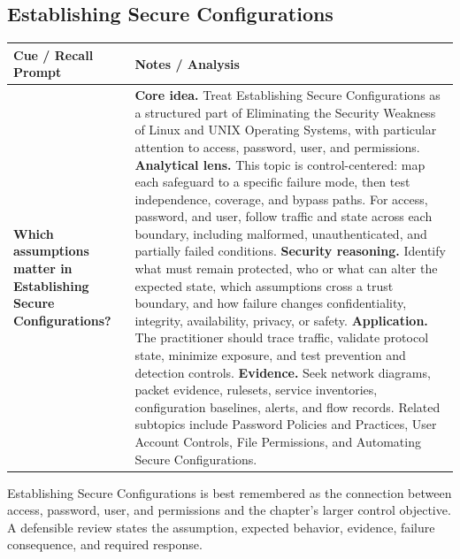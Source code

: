 \documentclass[11pt]{article}
\newcommand{\CornellHeader}{%
\rowcolor{Navy}\color{white}\bfseries Cue / Recall Prompt & \color{white}\bfseries Notes / Analysis\\\hline}
\newcommand{\CornellRow}[2]{%
\cellcolor{CueGray}\RaggedRight\textbf{#1} & \RaggedRight #2\\\hline}
\begin{document}
\subsection*{Establishing Secure Configurations}
\begin{longtable}{>{\RaggedRight\arraybackslash}p{}|>{\RaggedRight\arraybackslash}p{}}
\CornellHeader
\CornellRow{Which assumptions matter in Establishing Secure Configurations?}{\textbf{Core idea.} Treat Establishing Secure Configurations as a structured part of Eliminating the Security Weakness of Linux and UNIX Operating Systems, with particular attention to access, password, user, and permissions. \textbf{Analytical lens.} This topic is control-centered: map each safeguard to a specific failure mode, then test independence, coverage, and bypass paths. For access, password, and user, follow traffic and state across each boundary, including malformed, unauthenticated, and partially failed conditions. \textbf{Security reasoning.} Identify what must remain protected, who or what can alter the expected state, which assumptions cross a trust boundary, and how failure changes confidentiality, integrity, availability, privacy, or safety. \textbf{Application.} The practitioner should trace traffic, validate protocol state, minimize exposure, and test prevention and detection controls. \textbf{Evidence.} Seek network diagrams, packet evidence, rulesets, service inventories, configuration baselines, alerts, and flow records. Related subtopics include Password Policies and Practices, User Account Controls, File Permissions, and Automating Secure Configurations.}
\end{longtable}
\begin{topicsummary}
Establishing Secure Configurations is best remembered as the connection between access, password, user, and permissions and the chapter's larger control objective. A defensible review states the assumption, expected behavior, evidence, failure consequence, and required response.
\end{topicsummary}
\end{document}
